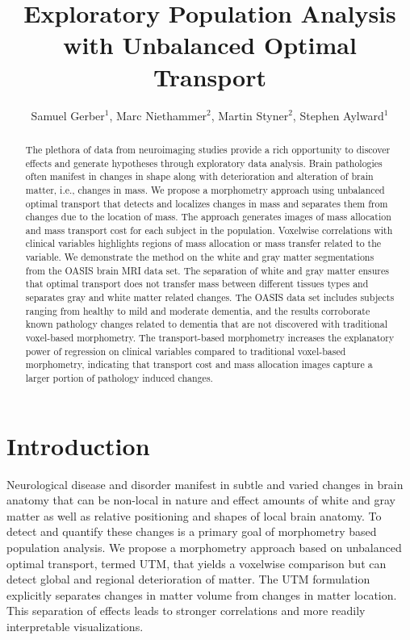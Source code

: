 \documentclass{llncs}
\begin{document}
\title{Exploratory Population Analysis with Unbalanced Optimal Transport}

\author{Samuel Gerber$^1$, Marc Niethammer$^2$, Martin Styner$^2$, Stephen Aylward$^1$}


\maketitle              

\begin{abstract}
The plethora of data from neuroimaging studies provide a rich opportunity to
discover effects and generate hypotheses through exploratory data analysis.
Brain pathologies often manifest in changes in shape along with deterioration
and alteration of brain matter, i.e., changes in mass. We propose a morphometry
approach using unbalanced optimal transport that detects and localizes changes in
mass and separates them from changes due to the location of mass. The approach
generates images of mass allocation and mass transport cost for each subject in
the population. Voxelwise correlations with clinical variables highlights
regions of mass allocation or mass transfer related to the variable.  We
demonstrate the method on the white and gray matter segmentations
from the OASIS brain MRI data set.  The separation of white and gray matter
ensures that optimal transport does not transfer mass between different
tissues types and separates gray and white matter related changes. The OASIS
data set includes subjects ranging from healthy to mild and moderate dementia,
and the results corroborate known pathology changes related to dementia that
are not discovered with traditional voxel-based morphometry. The
transport-based morphometry increases the explanatory power of regression on
clinical variables compared to traditional voxel-based morphometry, indicating
that transport cost and mass allocation images capture a larger portion of
pathology induced changes.  
\end{abstract}



\section{Introduction}
Neurological disease and disorder manifest in subtle and varied changes in
brain anatomy that can be non-local in nature and effect amounts of white and
gray matter as well as relative positioning and shapes of local brain anatomy.
To detect and quantify these changes is a primary goal of morphometry based
population analysis. We propose a morphometry approach based on unbalanced
optimal transport, termed UTM, that yields a voxelwise comparison but can
detect global and regional deterioration of matter. The UTM formulation
explicitly separates changes in matter volume from changes in matter location.
This separation of effects leads to stronger correlations and more readily
interpretable visualizations. 
\end{document}
